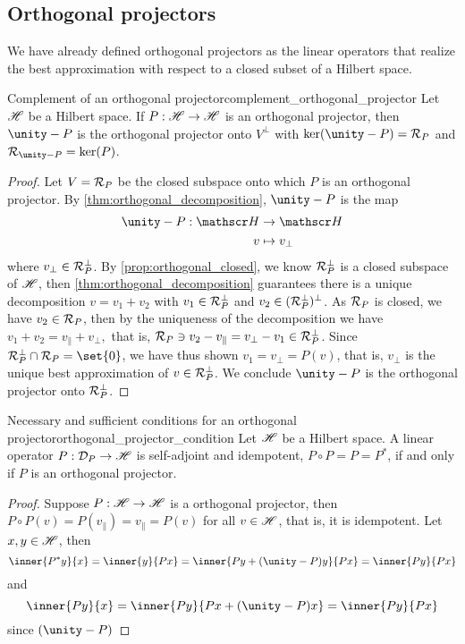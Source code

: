 \subsection{Orthogonal projectors}
We have already defined orthogonal projectors as the linear operators that realize the best approximation with respect to a closed subset of a Hilbert space.
\begin{lemma}{Complement of an orthogonal projector}{complement_orthogonal_projector}
    Let \(\mathscr{H}\) be a Hilbert space. If \(P : \mathscr{H} \to \mathscr{H}\) is an orthogonal projector, then \(\unity - P\) is the orthogonal projector onto \(V^\perp\) with \(\ker(\unity - P) = \range{P}\) and \(\range{\unity - P} = \ker(P)\).
\end{lemma}
\begin{proof}
    Let \(V = \mathcal{R}_{P}\) be the closed subspace onto which \(P\) is an orthogonal projector. By \cref{thm:orthogonal_decomposition}, \(\unity - P\) is the map
    \begin{align*}
        \unity - P : \hilbert &\to \hilbert\\
                            v &\mapsto v_\perp
    \end{align*}
    where \(v_\perp \in \mathcal{R}_{P}^\perp\). By \cref{prop:orthogonal_closed}, we know \(\mathcal{R}_{P}^\perp\) is a closed subspace of \(\mathscr{H}\), then \cref{thm:orthogonal_decomposition} guarantees there is a unique decomposition \(v = v_1 + v_2\) with \(v_1 \in \mathcal{R}_{P}^\perp\) and \(v_2 \in (\mathcal{R}_{P}^\perp)^\perp\). As \(\mathcal{R}_{P}\) is closed, we have \(v_2 \in \mathcal{R}_{P}\), then by the uniqueness of the decomposition we have \(v_1 + v_2 = v_\parallel + v_\perp,\) that is, \(\mathcal{R}_{P} \ni v_2 - v_\parallel = v_\perp - v_1 \in \mathcal{R}_{P}^\perp\). Since \(\range{P}^\perp \cap \range{P} = \set{0}\), we have thus shown \(v_1 = v_\perp = P(v)\), that is, \(v_\perp\) is the unique best approximation of \(v \in \mathcal{R}_{P}^\perp\). We conclude \(\unity - P\) is the orthogonal projector onto \(\mathcal{R}_{P}^\perp\).
\end{proof}

\begin{theorem}{Necessary and sufficient conditions for an orthogonal projector}{orthogonal_projector_condition}
    Let \(\mathscr{H}\) be a Hilbert space. A linear operator \(P : \mathcal{D}_{P} \to \mathscr{H}\) is self-adjoint and idempotent, \(P\circ P = P = P^*\), if and only if \(P\) is an orthogonal projector.
\end{theorem}
\begin{proof}
    Suppose \(P : \mathscr{H} \to \mathscr{H}\) is a orthogonal projector, then \(P \circ P(v) = P(v_\parallel) = v_\parallel = P(v)\)  for all \(v \in \mathscr{H}\), that is, it is idempotent. Let \(x, y \in \mathscr{H}\), then
    \begin{equation*}
        \inner{P^*y}{x} = \inner{y}{Px} = \inner{Py + (\unity - P)y}{Px} = \inner{Py}{Px}
    \end{equation*}
    and
    \begin{equation*}
        \inner{Py}{x} = \inner{Py}{Px + (\unity - P)x} = \inner{Py}{Px}
    \end{equation*}
    since \((\unity - P)\)
\end{proof}
